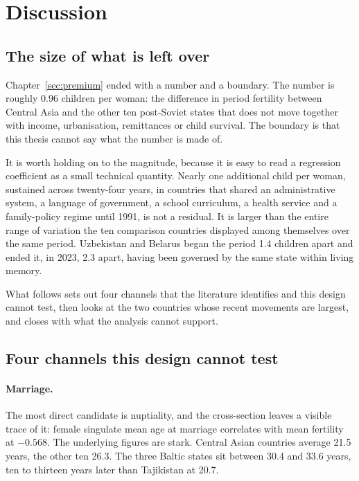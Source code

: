 
\section{Discussion}
\label{sec:discussion}

\subsection{The size of what is left over}
\label{sec:whats-left}

Chapter~\ref{sec:premium} ended with a number and a boundary. The number is roughly 0.96 children per woman: the difference in period fertility between Central Asia and the other ten post-Soviet states that does not move together with income, urbanisation, remittances or child survival. The boundary is that this thesis cannot say what the number is made of.

It is worth holding on to the magnitude, because it is easy to read a regression coefficient as a small technical quantity. Nearly one additional child per woman, sustained across twenty-four years, in countries that shared an administrative system, a language of government, a school curriculum, a health service and a family-policy regime until 1991, is not a residual. It is larger than the entire range of variation the ten comparison countries displayed among themselves over the same period. Uzbekistan and Belarus began the period 1.4 children apart and ended it, in 2023, 2.3 apart, having been governed by the same state within living memory.

What follows sets out four channels that the literature identifies and this design cannot test, then looks at the two countries whose recent movements are largest, and closes with what the analysis cannot support.

\subsection{Four channels this design cannot test}
\label{sec:channels}

\paragraph{Marriage.} The most direct candidate is nuptiality, and the cross-section leaves a visible trace of it: female singulate mean age at marriage correlates with mean fertility at $-0.568$. The underlying figures are stark. Central Asian countries average 21.5 years, the other ten 26.3. The three Baltic states sit between 30.4 and 33.6 years, ten to thirteen years later than Tajikistan at 20.7.

